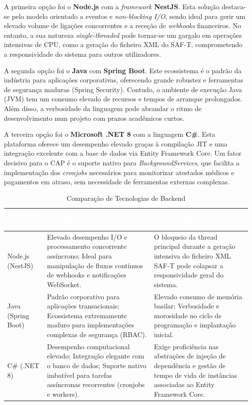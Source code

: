 \documentclass[a4paper,12pt]{scrreprt}
\begin{document}
{A primeira opção foi o \textbf{Node.js} com a \textit{framework} \textbf{NestJS}. Esta solução destaca-se pelo modelo orientado a eventos e \textit{non-blocking I/O}, sendo ideal para gerir um elevado volume de ligações concorrentes e a receção de \textit{webhooks} financeiros. No entanto, a sua natureza \textit{single-threaded} pode tornar-se um gargalo em operações intensivas de CPU, como a geração do ficheiro XML do SAF-T, comprometendo a responsividade do sistema para outros utilizadores.

A segunda opção foi o \textbf{Java} com \textbf{Spring Boot}. Este ecossistema é o padrão da indústria para aplicações corporativas, oferecendo grande robustez e ferramentas de segurança maduras (Spring Security). Contudo, o ambiente de execução Java (JVM) tem um consumo elevado de recursos e tempos de arranque prolongados. Além disso, a verbosidade da linguagem pode abrandar o ritmo de desenvolvimento num projeto com prazos académicos curtos.

A terceira opção foi o \textbf{Microsoft .NET 8} com a linguagem \textbf{C\#}. Esta plataforma oferece um desempenho elevado graças à compilação JIT e uma integração excelente com a base de dados via Entity Framework Core. Um fator decisivo para o CAP é o suporte nativo para \textit{BackgroundServices}, que facilita a implementação dos \textit{cronjobs} necessários para monitorizar atestados médicos e pagamentos em atraso, sem necessidade de ferramentas externas complexas.

\begin{table}[h]
\centering
\begin{tabular}{|p{3.5cm}|p{6cm}|p{6cm}|}
\hline
\rowcolor{headerblue}\textcolor{white}{\textbf{Opção de Backend}} & \textcolor{white}{\textbf{Vantagens}} & \textcolor{white}{\textbf{Desvantagens}} \\ \hline
Node.js (NestJS) & Elevado desempenho I/O e processamento concorrente assíncrono; Ideal para manipulação de fluxos contínuos de webhooks e notificações WebSocket. & O bloqueio da thread principal durante a geração intensiva do ficheiro XML SAF-T pode colapsar a responsividade geral do sistema. \\ \hline
Java (Spring Boot) & Padrão corporativo para aplicações transacionais; Ecossistema extremamente maduro para implementações complexas de segurança (RBAC). & Elevado consumo de memória basilar; Verbosidade e morosidade no ciclo de programação e implantação inicial. \\ \hline
C\# (.NET 8) & Desempenho computacional elevado; Integração elegante com o banco de dados; Suporte nativo imbatível para tarefas assíncronas recorrentes (cronjobs e workers). & Exige proficiência nas abstrações de injeção de dependência e gestão de tempo de vida de instâncias associadas ao Entity Framework Core. \\ \hline
\end{tabular}
\caption{Comparação de Tecnologias de Backend}
\end{table}

}
\end{document}
